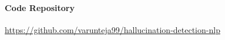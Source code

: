 \documentclass[11pt]{article}
\begin{document}
\paragraph{Code Repository} \url{https://github.com/varunteja99/hallucination-detection-nlp}




\end{document}

